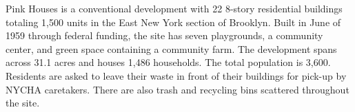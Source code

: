 Pink Houses is a conventional development with 22 8-story residential buildings totaling 1,500 units in the East New York section of Brooklyn. Built in June of 1959 through federal funding, the site has seven playgrounds, a community center, and green space containing a community farm. The development spans across 31.1 acres and houses 1,486 households. The total population is 3,600. Residents are asked to leave their waste in front of their buildings for pick-up by NYCHA caretakers. There are also trash and recycling bins scattered throughout the site.